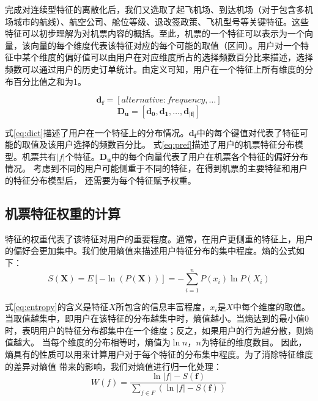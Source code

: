 完成对连续型特征的离散化后，我们又选取了起飞机场、到达机场（对于包含多机场城市的航线）、航空公司、舱位等级、退改签政策、飞机型号等关键特征。这些特征可以初步理解为对机票内容的概括。至此，机票的一个特征可以表示为一个向量，该向量的每个维度代表该特征对应的每个可能的取值（区间）。用户对一个特征中某个维度的偏好值可以由用户在对应维度所占的选择频数百分比来描述，选择频数可以通过用户的历史订单统计。由定义可知，用户在一个特征上所有维度的分布百分比值之和为1。

\begin{equation}
\label{eq:dict}
	\mathbf{d_f} = [alternative:frequency,\dots]
\end{equation}
\begin{equation}
\label{eq:pref}
	\mathbf{D_u} = [\mathbf{d_0},\mathbf{d_1},\dots,\mathbf{d_{|f|}}]
\end{equation}

式\ref{eq:dict}描述了用户在一个特征上的分布情况。$\mathbf{d_f}$中的每个键值对代表了特征可能的取值及该用户选择的频数百分比。
式\ref{eq:pref}描述了用户的机票特征分布模型。机票共有$|f|$个特征。$\mathbf{D_u}$中的每个向量代表了用户在机票各个特征的偏好分布情况。
考虑到不同的用户可能侧重于不同的特征，在得到机票的主要特征和用户的特征分布模型后，
还需要为每个特征赋予权重。

\subsection{机票特征权重的计算}

特征的权重代表了该特征对用户的重要程度。通常，在用户更侧重的特征上，用户的偏好会更加集中。我们使用熵值来描述用户特征分布的集中程度。熵的公式如下：
\begin{equation}
\label{eq:entropy}
	S(\mathbf{X}) = E[-\ln (P(\mathbf{X}))] = - \sum_{i=1}^n P(x_i)\ln P(X_i)
\end{equation}

式\ref{eq:entropy}的含义是特征$X$所包含的信息丰富程度，$x_i$是$X$中每个维度的取值。
当取值越集中，即用户在该特征的分布越集中时，熵值越小。当熵达到的最小值$0$时，表明用户的特征分布都集中在一个维度；反之，如果用户的行为越分散，则熵值越大。
当每个维度的分布相等时，熵值为$\ln n$，$n$为特征的维度数目。
因此，熵具有的性质可以用来计算用户对于每个特征的分布集中程度。为了消除特征维度的差异对熵值
带来的影响，我们对熵值进行归一化处理：
\begin{equation}
  W(f) = \frac{\ln |f| - S(\mathbf{f})}{\sum_{f \in F}(\ln |f| - S(\mathbf{f}))}
\end{equation}

